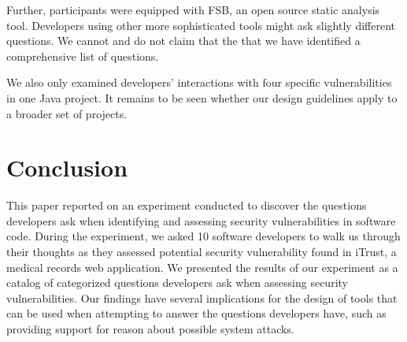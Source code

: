 \documentclass[conference]{IEEEtran}
\newcommand{\blind}[1]{{\color{white}\{#1\}}}
\begin{document}
Further, participants were equipped with FSB, an open source static analysis tool. 
Developers using other more sophisticated tools might ask slightly different questions.
We cannot and do not claim that the that we have identified a comprehensive list of questions.

We also only examined developers' interactions with four specific vulnerabilities in one Java project. 
It remains to be seen whether our design guidelines apply to a broader set of projects.




\section{Conclusion}
\label{sec:concl}
This paper reported on an experiment conducted to discover the questions developers ask when identifying and assessing security vulnerabilities in software code.
During the experiment, we asked 10 software developers to walk us through their thoughts as they assessed potential security vulnerability found in iTrust, a medical records web application.
We presented the results of our experiment as a catalog of categorized questions developers ask when assessing security vulnerabilities.
Our findings have several implications for the design of tools that can be used when attempting to answer the questions developers have, such as providing support for reason about possible system attacks.










%



\end{document}
